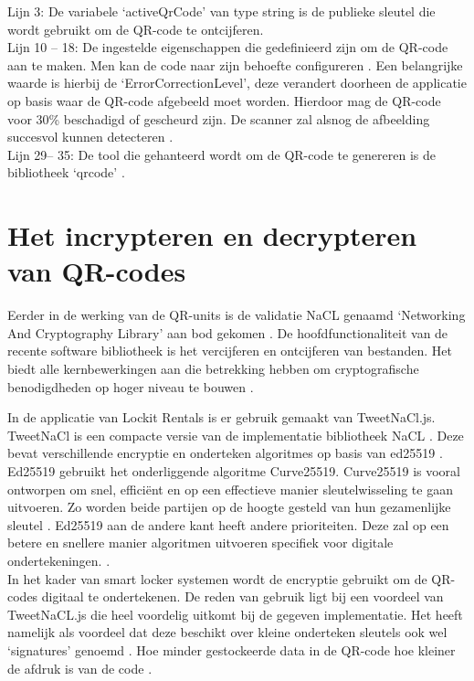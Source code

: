 Lijn 3: De variabele ‘activeQrCode’ van type string is de publieke sleutel die wordt gebruikt om de QR-code te ontcijferen. \\
Lijn 10 – 18: De ingestelde eigenschappen die gedefinieerd zijn om de QR-code aan te maken. Men kan de code naar zijn behoefte configureren \autocite{Sutheebanjard2010}. Een belangrijke waarde is hierbij de ‘ErrorCorrectionLevel’, deze verandert doorheen de applicatie op basis waar de QR-code afgebeeld moet worden. Hierdoor mag de QR-code voor 30\% beschadigd of gescheurd zijn. De scanner zal alsnog de afbeelding succesvol kunnen detecteren \autocite{Tiwari2016}. \\
Lijn 29– 35: De tool die gehanteerd wordt om de QR-code te genereren is de bibliotheek ‘qrcode’ \autocite{pypi2023}. 

\newpage
\section{Het incrypteren en decrypteren van QR-codes}%
\label{sec:encryptQR-code}

Eerder in de werking van de QR-units is de validatie NaCL genaamd ‘Networking And Cryptography Library’ aan bod gekomen \autocite{Bernstein}. De hoofdfunctionaliteit van de recente software bibliotheek is het vercijferen en ontcijferen van bestanden. Het biedt alle kernbewerkingen aan die betrekking hebben om cryptografische benodigdheden op hoger niveau te bouwen \autocite{Bernsteina}.

In de applicatie van Lockit Rentals is er gebruik gemaakt van TweetNaCl.js. TweetNaCl is een compacte versie van de implementatie bibliotheek NaCL \autocite{Bernstein2014} \autocite{Bernsteinb}. Deze bevat verschillende encryptie en onderteken algoritmes op basis van ed25519 \autocite{Bernstein2011}. \\
Ed25519 gebruikt het onderliggende algoritme Curve25519. Curve25519 is vooral ontworpen om snel, efficiënt en op een effectieve manier sleutelwisseling te gaan uitvoeren. Zo worden beide partijen op de hoogte gesteld van hun gezamenlijke sleutel \autocite{Bernstein2006}. Ed25519 aan de andere kant heeft andere prioriteiten. Deze zal op een betere en snellere manier algoritmen uitvoeren specifiek voor digitale ondertekeningen. \autocite{Bernstein2011}. \\
In het kader van smart locker systemen wordt de encryptie gebruikt om de QR-codes digitaal te ondertekenen. De reden van gebruik ligt bij een voordeel van TweetNaCL.js die heel voordelig uitkomt bij de gegeven implementatie. Het heeft namelijk als voordeel dat deze beschikt over kleine onderteken sleutels ook wel ‘signatures’ genoemd \autocite{Bernstein2011}. Hoe minder gestockeerde data in de QR-code hoe kleiner de afdruk is van de code \autocite{Chow2016}.

